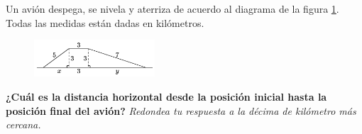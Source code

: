 \question[15]  Un avión despega, se nivela y aterriza de acuerdo al diagrama de la figura \ref{fig:des_pitagoras_07}.
Todas las medidas están dadas en kilómetros.

\begin{figure}[H]
    \begin{center}
        \includegraphics[width=0.4\textwidth]{../images/des_pitagoras_07.png}
    \end{center}
    \caption{}
    \label{fig:des_pitagoras_07}
\end{figure}

\textbf{¿Cuál es la distancia horizontal desde la posición inicial hasta la posición final del avión?}
\textit{Redondea tu respuesta a la décima de kilómetro más cercana.}
